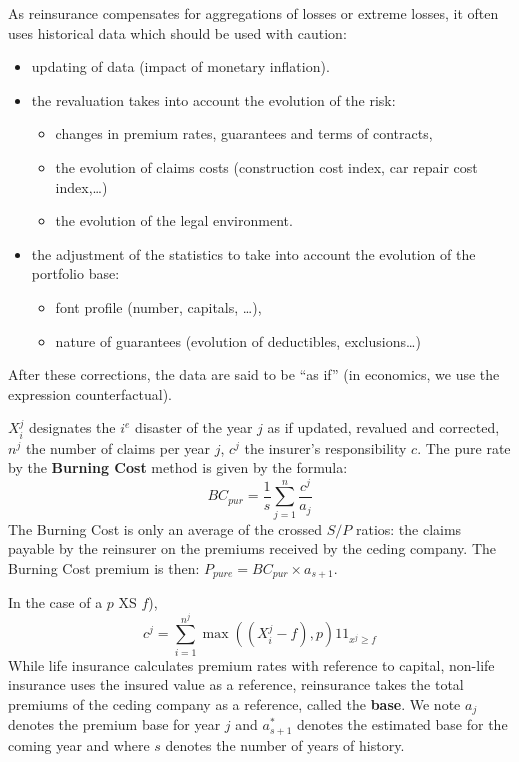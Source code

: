 \begin{f}

As reinsurance compensates for aggregations of losses or extreme losses, it often uses historical data which should be used with caution:
\begin{itemize}
	\item updating of data (impact of monetary inflation).
	\item the revaluation takes into account the evolution of the risk:
	\begin{itemize}
		\item changes in premium rates, guarantees and terms of contracts,
		\item the evolution of claims costs (construction cost index, car repair cost index,\ldots)
		\item the evolution of the legal environment.
	\end{itemize}
	\item the adjustment of the statistics to take into account the evolution of the portfolio base:
	\begin{itemize}
		\item font profile (number, capitals, \ldots),
		\item nature of guarantees (evolution of deductibles, exclusions\ldots)
	\end{itemize}
\end{itemize}
After these corrections, the data are said to be \enquote{as if} (in economics, we use the expression counterfactual).

\end{f}


\begin{f}
	
	\(X_{i}^{j}\) designates the \(i^{e}\) disaster of the year \(j\) as if updated, revalued and corrected,
\(n^j\) the number of claims per year \(j\), \(c^{j}\) the insurer's responsibility \(c\).
The pure rate by the \textbf{Burning Cost} method is given by the formula:
\[
BC_{pur}=\frac{1}{s}\sum_{j=1}^{n}\frac{c^{j}}{a_{j}}
\] 
The Burning Cost is only an average of the crossed \(S/P\) ratios: the claims payable by the reinsurer on the premiums received by the ceding company.
The Burning Cost premium is then: \(P_{pure}=BC_{pur}\times a_{s+1}\).

In the case of a \(p\) XS \(f\)), \[
c^{j}=\sum_{i=1}^{n^j}\max\left(  \left( X_{i}^{j}-f\right),p\right) 1\!\!1_{x^{j}\geq f}
\]
While life insurance calculates premium rates with reference to capital, non-life insurance uses the insured value as a reference, reinsurance takes the total premiums of the ceding company as a reference, called the \textbf{base}.
We note \(a_{j}\) denotes the premium base for year \(j\) and \(a_{s+1}^{*}\) denotes the estimated base for the coming year and where \(s\) denotes the number of years of history.
\end{f}




